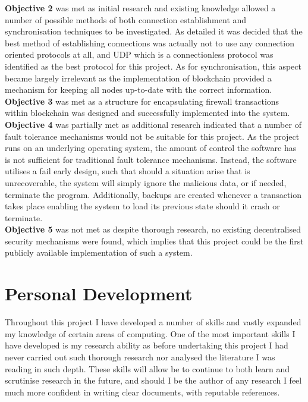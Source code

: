 \documentclass[a4paper, 11pt]{report}
\begin{document}
\textbf{Objective 2} was met as initial research and existing knowledge allowed a number of possible methods of both connection establishment and synchronisation techniques to be investigated. As detailed it was decided that the best method of establishing connections was actually not to use any connection oriented protocols at all, and \acrshort{UDP} which is a connectionless protocol was identified as the best protocol for this project. As for synchronisation, this aspect became largely irrelevant as the implementation of \gls{blockchain} provided a mechanism for keeping all nodes up-to-date with the correct information.\\

\textbf{Objective 3} was met as a structure for encapsulating firewall transactions within \gls{blockchain} was designed and successfully implemented into the system.\\

\textbf{Objective 4} was partially met as additional research indicated that a number of fault tolerance mechanisms would not be suitable for this project. As the project runs on an underlying operating system, the amount of control the software has is not sufficient for traditional fault tolerance mechanisms. Instead, the software utilises a fail early design, such that should a situation arise that is unrecoverable, the system will simply ignore the malicious data, or if needed, terminate the program. Additionally, backups are created whenever a transaction takes place enabling the system to load its previous state should it crash or terminate.\\

\textbf{Objective 5} was not met as despite thorough research, no existing decentralised security mechanisms were found, which implies that this project could be the first publicly available implementation of such a system.

\section{Personal Development}
Throughout this project I have developed a number of skills and vastly expanded my knowledge of certain areas of computing. One of the most important skills I have developed is my research ability as before undertaking this project I had never carried out such thorough research nor analysed the literature I was reading in such depth. These skills will allow be to continue to both learn and scrutinise research in the future, and should I be the author of any research I feel much more confident in writing clear documents, with reputable references.
\end{document}
